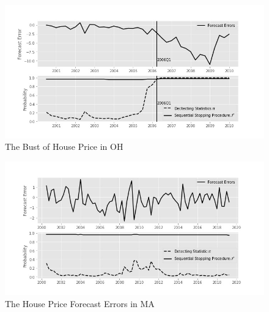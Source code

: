 \documentclass[preprint,authoryear,12pt,english]{elsarticle}
\theoremstyle{plain}
\begin{document}
\noindent \begin{center}
    \begin{figure}[H]
        \centering
        \includegraphics[scale=0.5]{"graph/Bsquid_OH"}
        \protect\caption{\label{fig:OH}The Bust of House Price in OH}
    \end{figure}
    \par\end{center}
\noindent \begin{center}
    \begin{figure}[H]
        \centering
        \includegraphics[scale=0.5]{"graph/Bsquid_MA"}
        \protect\caption{\label{fig:MA}The House Price Forecast Errors in MA}
    \end{figure}
    \par\end{center}
\end{document}
